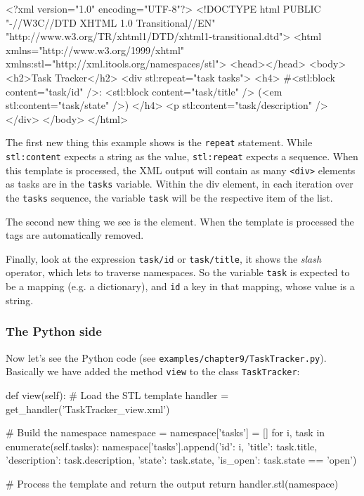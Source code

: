 \begin{code}
    <?xml version="1.0" encoding="UTF-8"?>
    <!DOCTYPE html
         PUBLIC "-//W3C//DTD XHTML 1.0 Transitional//EN"
         "http://www.w3.org/TR/xhtml1/DTD/xhtml1-transitional.dtd">
    <html xmlns="http://www.w3.org/1999/xhtml"
          xmlns:stl="http://xml.itools.org/namespaces/stl">
      <head></head>
      <body>
        <h2>Task Tracker</h2>
        <div stl:repeat="task tasks">
          <h4>
            #<stl:block content="task/id" />:
            <stl:block content="task/title" />
            (<em stl:content="task/state" />)
          </h4>
          <p stl:content="task/description" />
        </div>
      </body>
    </html>
\end{code}

The first new thing this example shows is the {\tt repeat} statement. While
{\tt stl:content} expects a string as the value, {\tt stl:repeat} expects a
sequence. When this template is processed, the XML output will contain as
many {\tt <div>} elements as tasks are in the {\tt tasks} variable. Within
the div element, in each iteration over the {\tt tasks} sequence, the
variable {\tt task} will be the respective item of the list.

The second new thing we see is the {\tt <stl:block>} element. When the
template is processed the {\tt <stl:block>} tags are automatically
removed.

Finally, look at the expression {\tt task/id} or {\tt task/title}, it shows
the {\em slash} operator, which lets to traverse namespaces. So the variable
{\tt task} is expected to be a mapping (e.g. a dictionary), and
{\tt id} a key in that mapping, whose value is a string.

\subsubsection{The Python side}

Now let's see the Python code (see {\tt examples/chapter9/TaskTracker.py}).
Basically we have added the method {\tt view} to the class {\tt TaskTracker}:

\begin{code}
    def view(self):
        # Load the STL template
        handler = get_handler('TaskTracker_view.xml')

        # Build the namespace
        namespace = {}
        namespace['tasks'] = []
        for i, task in enumerate(self.tasks):
            namespace['tasks'].append({'id': i,
                                       'title': task.title,
                                       'description': task.description,
                                       'state': task.state,
                                       'is_open': task.state == 'open'})

        # Process the template and return the output
        return handler.stl(namespace)
\end{code}

